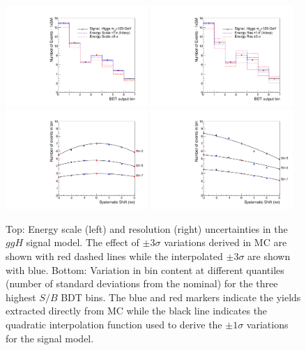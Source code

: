 \begin{figure}
\begin{center}
  \includegraphics[width=0.48\textwidth]{hgg7TeV/sidebandMvaPlots/signalModel/systematic_interpolation_test_E_scale.pdf}
  \includegraphics[width=0.48\textwidth]{hgg7TeV/sidebandMvaPlots/signalModel/systematic_interpolation_test_E_res.pdf}
  \includegraphics[width=0.48\textwidth]{hgg7TeV/sidebandMvaPlots/signalModel/systematic_interpolation_test_curves_E_scale.pdf}
  \includegraphics[width=0.48\textwidth]{hgg7TeV/sidebandMvaPlots/signalModel/systematic_interpolation_test_curves_E_res.pdf}
\end{center}
 \caption{Top: Energy scale (left) and resolution (right) uncertainties in the $ggH$ signal model. 
The effect of $\pm3\sigma$ variations 
derived in MC are shown with red dashed lines while the interpolated $\pm3\sigma$ are shown with blue.
Bottom: Variation in bin content at different quantiles (number of standard deviations from the nominal) for the
three highest $S/B$ BDT bins. 
The blue and red markers indicate the yields extracted directly from MC while the black line indicates the 
quadratic interpolation function used to derive the $\pm1\sigma$ variations for the signal model.}
 \label{fig:signalmodel_escaleres}
\end{figure}

